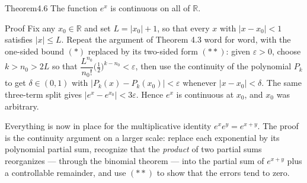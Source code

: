 \documentclass[a4paper,12pt,oneside]{memoir}
\begin{document}
\begin{envtheorem}{Theorem}{4.6}{}
The function \(e^{x}\) is continuous on all of \(\mathbb{R}\).
\end{envtheorem}
\begin{envproof}{Proof}{}{}
Fix any \(x_{0} \in \mathbb{R}\) and set \(L = \lvert x_{0} \rvert + 1\), so that every \(x\) with \(\lvert x - x_{0} \rvert < 1\) satisfies \(\lvert x \rvert \le L\). Repeat the argument of Theorem 4.3 word for word, with the one-sided bound \((*)\) replaced by its two-sided form \((**)\): given \(\varepsilon > 0\), choose \(k > n_{0} > 2L\) so that \(\dfrac{L^{n_{0}}}{n_{0}!}\bigl(\tfrac{1}{2}\bigr)^{k - n_{0}} < \varepsilon\), then use the continuity of the polynomial \(P_{k}\) to get \(\delta \in (0, 1)\) with \(\lvert P_{k}(x) - P_{k}(x_{0}) \rvert < \varepsilon\) whenever \(\lvert x - x_{0} \rvert < \delta\). The same three-term split gives \(\lvert e^{x} - e^{x_{0}} \rvert < 3\varepsilon\). Hence \(e^{x}\) is continuous at \(x_{0}\), and \(x_{0}\) was arbitrary. \qedmark
\end{envproof}
Everything is now in place for the multiplicative identity \(e^{x} e^{y} = e^{x + y}\). The proof is the continuity argument on a larger scale: replace each exponential by its polynomial partial sum, recognize that the \emph{product} of two partial sums reorganizes — through the binomial theorem — into the partial sum of \(e^{x+y}\) plus a controllable remainder, and use \((**)\) to show that the errors tend to zero.
\end{document}
